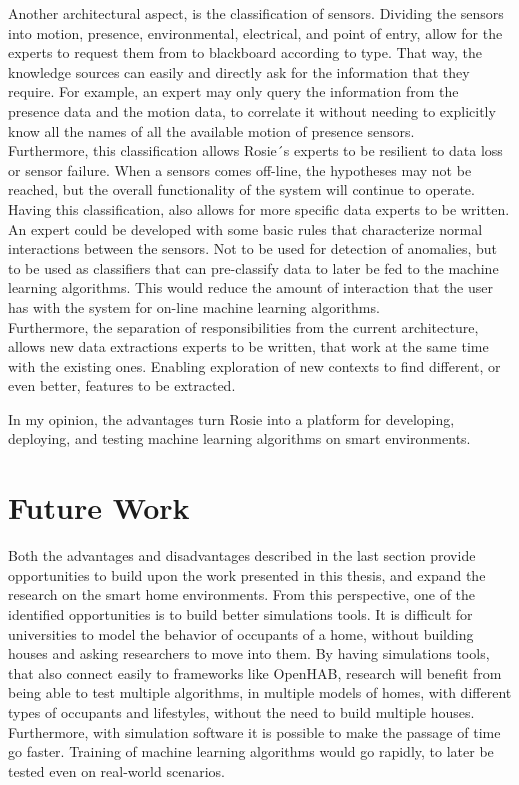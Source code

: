 Another architectural aspect, is the classification of sensors. Dividing the sensors into motion, presence, environmental, electrical, and point of entry, allow for the experts to request them from to blackboard according to type. That way, the knowledge sources can easily and directly ask for the information that they require. For example, an expert may only query the information from the presence data and the motion data, to correlate it without needing to explicitly know all the names of all the available motion of presence sensors.\\
Furthermore, this classification allows Rosie´s experts to be resilient to data loss or sensor failure. When a sensors comes off-line, the hypotheses may not be reached, but the overall functionality of the system will continue to operate.\\
Having this classification, also allows for more specific data experts to be written. An expert could be developed with some basic rules that characterize normal interactions between the sensors. Not to be used for detection of anomalies, but to be used as classifiers that can  pre-classify data to later be fed to the machine learning algorithms. This would reduce the amount of interaction that the user has with the system for on-line machine learning algorithms.\\
Furthermore, the separation of responsibilities from the current architecture, allows new data extractions experts to be written, that work at the same time with the existing ones. Enabling exploration of new contexts to find different, or even better, features to be extracted. 

In my opinion, the advantages turn Rosie into a platform for developing, deploying, and testing machine learning algorithms on smart environments.

\section{Future Work}
Both the advantages and disadvantages described in the last section provide opportunities to build upon the work presented in this thesis, and expand the research on the smart home environments.
From this perspective, one of the identified opportunities is to build better simulations tools. It is difficult for universities to model the behavior of occupants of a home, without building houses and asking researchers to move into them. By having simulations tools, that also connect easily to frameworks like OpenHAB, research will benefit from being able to test multiple algorithms, in multiple models of homes, with different types of occupants and lifestyles, without the need to build multiple houses. Furthermore, with simulation software it is possible to make the passage of time go faster. Training of machine learning algorithms would go rapidly, to later be tested even on real-world 
scenarios.


